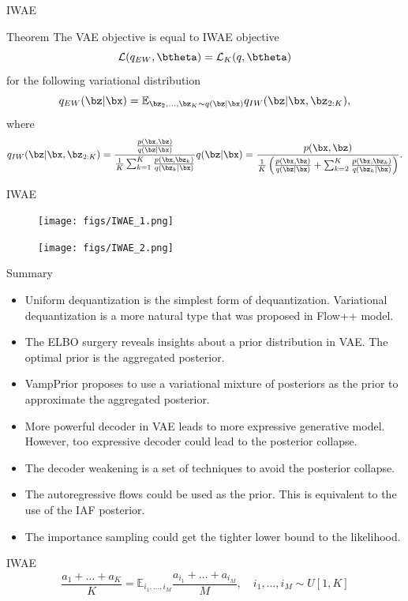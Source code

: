 \begin{frame}{IWAE}
	\begin{block}{Theorem}
		The VAE objective is equal to IWAE objective 
		\[
		\mathcal{L}(q_{EW}, \btheta) = \mathcal{L}_K(q, \btheta)
		\]
		for the following variational distribution
		\[
		q_{EW}(\bz | \bx) = \mathbb{E}_{\bz_2, \dots, \bz_K \sim q(\bz | \bx)} q_{IW}(\bz | \bx, \bz_{2:K}),
		\]
		where \[
		q_{IW}(\bz | \bx, \bz_{2:K}) = \frac{\frac{p(\bx, \bz)}{q(\bz | \bx)}}{\frac{1}{K} \sum_{k=1}^K \frac{p(\bx, \bz_k)}{q(\bz_k | \bx)}} q(\bz | \bx) = \frac{p(\bx, \bz)}{\frac{1}{K}\left( \frac{p(\bx, \bz)}{q(\bz | \bx)} + \sum_{k=2}^K \frac{p(\bx, \bz_k)}{q(\bz_k | \bx)}\right)}.
		\]
	\end{block}
	
\end{frame}
\begin{frame}{IWAE}
	\begin{figure}
		\centering
		\texttt{[image: figs/IWAE\_1.png]}
	\end{figure}
	\begin{figure}
		\centering
		\texttt{[image: figs/IWAE\_2.png]}
	\end{figure}

\end{frame}
\begin{frame}{Summary}
	\begin{itemize}
		\vfill
		\item Uniform dequantization is the simplest form of dequantization. Variational dequantization is a more natural type that was proposed in Flow++ model.
		\item The ELBO surgery reveals insights about a prior distribution in VAE. The optimal prior is the aggregated posterior.
		\item VampPrior proposes to use a variational mixture of posteriors as the prior to approximate the aggregated posterior.
		\item More powerful decoder in VAE leads to more expressive generative model. However, too expressive decoder could lead to the posterior collapse.
		\item The decoder weakening is a set of techniques to avoid the posterior collapse.
		\item The autoregressive flows could be used as the prior. This is equivalent to the use of the IAF posterior. 
		\item The importance sampling could get the tighter lower bound to the likelihood.
	\end{itemize}
\end{frame}
\begin{frame}{IWAE}
\[
\frac{a_1 + \dots + a_K}{K} = \mathbb{E}_{i_1, \dots, i_M} \frac{a_{i_1} + \dots + a_{i_M}}{M}, \quad i_1, \dots, i_M \sim U[1, K]
\]
\end{frame}

 